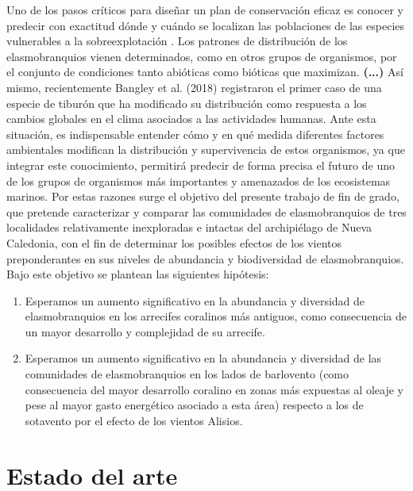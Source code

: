 \documentclass[a4paper, 11pt]{article}
\begin{document}
Uno de los pasos críticos para diseñar un plan de conservación eficaz es conocer y predecir con exactitud dónde y cuándo se localizan las poblaciones de las especies vulnerables a la sobreexplotación \cite{Espinoza2014}. Los patrones de distribución de los elasmobranquios vienen determinados, como en otros grupos de organismos, por el conjunto de condiciones tanto abióticas como bióticas que maximizan. \textbf{(...)} Así mismo, recientemente Bangley et al. (2018) registraron el primer caso de una especie de tiburón que ha modificado su distribución como respuesta a los cambios globales en el clima asociados a las actividades humanas. Ante esta situación, es indispensable entender cómo y en qué medida diferentes factores ambientales modifican la distribución y supervivencia de estos organismos, ya que integrar este conocimiento, permitirá predecir de forma precisa el futuro de uno de los grupos de organismos más importantes y amenazados de los ecosistemas marinos. Por estas razones surge el objetivo del presente trabajo de fin de grado, que pretende caracterizar y comparar las comunidades de elasmobranquios de tres localidades relativamente inexploradas e intactas del archipiélago de Nueva Caledonia, con el fin de determinar los posibles efectos de los vientos preponderantes en sus niveles de abundancia y biodiversidad de elasmobranquios. Bajo este objetivo se plantean las siguientes hipótesis:
\begin{enumerate}
\item Esperamos un aumento significativo en la abundancia y diversidad de elasmobranquios en los arrecifes coralinos más antiguos, como consecuencia de un mayor desarrollo y complejidad de su arrecife.
\item Esperamos un aumento significativo en la abundancia y diversidad de las comunidades de elasmobranquios en los lados de barlovento (como consecuencia del mayor desarrollo coralino en zonas más expuestas al oleaje y pese al mayor gasto energético asociado a esta área) respecto a los de sotavento por el efecto de los vientos Alisios.
\end{enumerate}

\section{Estado del arte}
\end{document}
